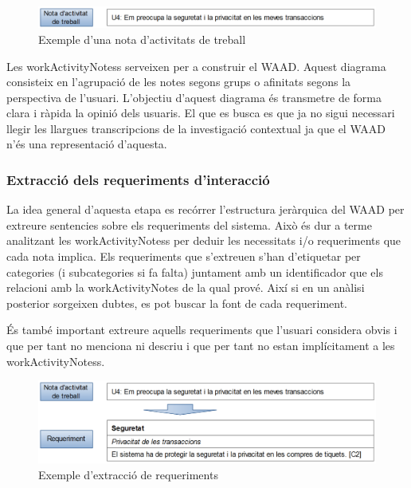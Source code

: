 \begin{figure}[htp]
\centering
\includegraphics[scale=0.3]{WorkActivityNotes1.png}
\caption{Exemple d'una nota d'activitats de treball}\label{fig:workActivityNote1}
\end{figure}

Les \glspl{workActivityNotes} serveixen per a construir el \ac{WAAD}. Aquest diagrama consisteix en l'agrupació de les notes segons grups o afinitats segons la perspectiva de l'usuari. L'objectiu d'aquest diagrama és transmetre de forma clara i ràpida la opinió dels usuaris. El que es busca es que ja no sigui necessari llegir les llargues transcripcions de la investigació contextual ja que el \ac{WAAD} n'és una representació d'aquesta. 


\subsubsection{Extracció dels requeriments d'interacció}\label{subsubsec:Extraccio_requeriments}
La idea general d'aquesta etapa es recórrer l'estructura jeràrquica del \ac{WAAD} per extreure sentencies sobre els requeriments del sistema. Això és dur a terme analitzant les \glspl{workActivityNotes} per deduir les necessitats i/o requeriments que cada nota implica. Els requeriments que s'extreuen s'han d'etiquetar per categories (i subcategories si fa falta) juntament amb un identificador que els relacioni amb la \gls{workActivityNotes} de la qual prové. Així si en un anàlisi posterior sorgeixen dubtes, es pot buscar la font de cada requeriment. 

És també important extreure aquells requeriments que l'usuari considera obvis i que per tant no menciona ni descriu i que per tant no estan implícitament a les \glspl{workActivityNotes}.

\begin{figure}[htp]
\centering
\includegraphics[scale=0.3]{WorkActivityNotes2.png}
\caption{Exemple d'extracció de requeriments}\label{fig:workActivityNote2}
\end{figure}


